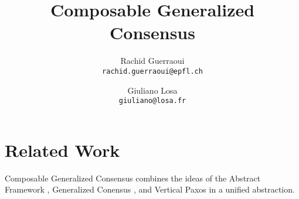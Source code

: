 




\title{Composable Generalized Consensus}

\author{
  Rachid Guerraoui\\
  \texttt{rachid.guerraoui@epfl.ch}
  \and
  Giuliano Losa\\
  \texttt{giuliano@losa.fr}
}

\date{}



\maketitle




\newpage



%


\section{Related Work}
\label{sec:related}

\begin{comment}
SMR is often implemented using a sequence of instances of Consensus.
There are numerous examples of consensus algorithms in the literature.
However, Composable Generalized Consensus is based on Generalized Consensus. 
In Generalized Consensus \cite{Lamport05GeneralizeConsensus}, the learners of a
SMR algorithm repeatedly learn new values belonging to a \emph{C-struct set}. A
C-struct can be seen as a data structure encoding  sequences of commands modulo
the ordering of commands that commute. The advantage of Generalized
Consensus over Consensus is that
two servers which receive commuting commands in different orders can still reach
agreement on C-structs without further synchronization. 
Our Composable Generalized Consensus can also use C-structs, with the same advantages
as Generalized Consensus. 
\end{comment}

Composable Generalized Consensus combines the ideas of the Abstract Framework \cite{GuerraouiETAL10Next700BftProtocols}, Generalized Conensus  \cite{Lamport05GeneralizeConsensus}, and Vertical Paxos \cite{LamportMalkhiZhou09VerticalPaxosPrimarybackupReplication} in a
unified abstraction. 


